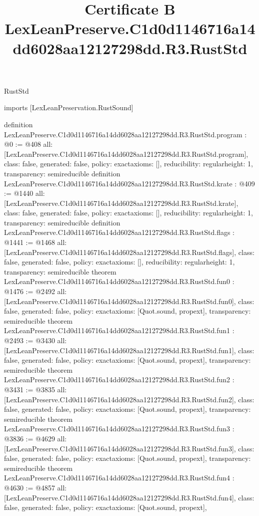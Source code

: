 \begin{lexlean}{RustStd}
\title{Certificate B LexLeanPreserve.C1d0d1146716a14dd6028aa12127298dd.R3.RustStd}
\begin{coremodule}
imports [LexLeanPreservation.RustSound]

definition LexLeanPreserve.C1d0d1146716a14dd6028aa12127298dd.R3.RustStd.program : @0 := @408 {
  all: [LexLeanPreserve.C1d0d1146716a14dd6028aa12127298dd.R3.RustStd.program],
  class: false,
  generated: false,
  policy: exact{axioms: []},
  reducibility: regular{height: 1},
  transparency: semireducible
}
definition LexLeanPreserve.C1d0d1146716a14dd6028aa12127298dd.R3.RustStd.krate : @409 := @1440 {
  all: [LexLeanPreserve.C1d0d1146716a14dd6028aa12127298dd.R3.RustStd.krate],
  class: false,
  generated: false,
  policy: exact{axioms: []},
  reducibility: regular{height: 1},
  transparency: semireducible
}
definition LexLeanPreserve.C1d0d1146716a14dd6028aa12127298dd.R3.RustStd.flags : @1441 := @1468 {
  all: [LexLeanPreserve.C1d0d1146716a14dd6028aa12127298dd.R3.RustStd.flags],
  class: false,
  generated: false,
  policy: exact{axioms: []},
  reducibility: regular{height: 1},
  transparency: semireducible
}
theorem LexLeanPreserve.C1d0d1146716a14dd6028aa12127298dd.R3.RustStd.fun0 : @1476 := @2492 {
  all: [LexLeanPreserve.C1d0d1146716a14dd6028aa12127298dd.R3.RustStd.fun0],
  class: false,
  generated: false,
  policy: exact{axioms: [Quot.sound, propext]},
  transparency: semireducible
}
theorem LexLeanPreserve.C1d0d1146716a14dd6028aa12127298dd.R3.RustStd.fun1 : @2493 := @3430 {
  all: [LexLeanPreserve.C1d0d1146716a14dd6028aa12127298dd.R3.RustStd.fun1],
  class: false,
  generated: false,
  policy: exact{axioms: [Quot.sound, propext]},
  transparency: semireducible
}
theorem LexLeanPreserve.C1d0d1146716a14dd6028aa12127298dd.R3.RustStd.fun2 : @3431 := @3835 {
  all: [LexLeanPreserve.C1d0d1146716a14dd6028aa12127298dd.R3.RustStd.fun2],
  class: false,
  generated: false,
  policy: exact{axioms: [Quot.sound, propext]},
  transparency: semireducible
}
theorem LexLeanPreserve.C1d0d1146716a14dd6028aa12127298dd.R3.RustStd.fun3 : @3836 := @4629 {
  all: [LexLeanPreserve.C1d0d1146716a14dd6028aa12127298dd.R3.RustStd.fun3],
  class: false,
  generated: false,
  policy: exact{axioms: [Quot.sound, propext]},
  transparency: semireducible
}
theorem LexLeanPreserve.C1d0d1146716a14dd6028aa12127298dd.R3.RustStd.fun4 : @4630 := @4857 {
  all: [LexLeanPreserve.C1d0d1146716a14dd6028aa12127298dd.R3.RustStd.fun4],
  class: false,
  generated: false,
  policy: exact{axioms: [Quot.sound, propext]},
}
\end{coremodule}
\end{lexlean}
